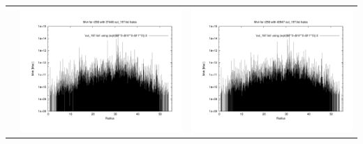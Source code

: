 \begin{itemize}
\begin{table}[p]
\begin{tabular}{l|c|c}
 & \includegraphics[scale=0.25]{r256/h70/red_st14_log2/plot_mvir_out_197.pdf} & \includegraphics[scale=0.25]{r256/h100/red_st14_log2/plot_mvir_out_197.pdf} \\

\end{tabular}
\end{table}
\end{itemize}

